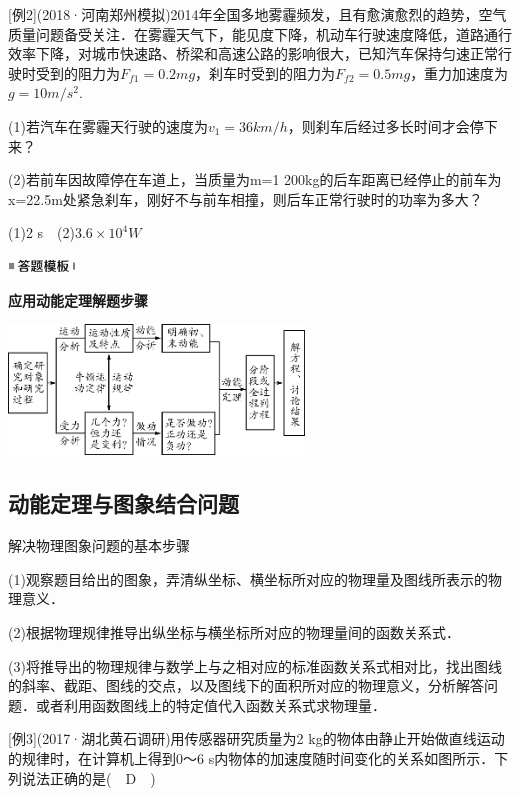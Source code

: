 \documentclass[cn,10.5pt,chinese,mac,chinesefont=founder]{elegantbook}
\begin{document}
{[}例2{]}(2018·河南郑州模拟)2014年全国多地雾霾频发，且有愈演愈烈的趋势，空气质量问题备受关注．在雾霾天气下，能见度下降，机动车行驶速度降低，道路通行效率下降，对城市快速路、桥梁和高速公路的影响很大，已知汽车保持匀速正常行驶时受到的阻力为$F_{f1}=0.2mg$，刹车时受到的阻力为$F_{f2}=0.5mg$，重力加速度为$g=10m/s^2$.

(1)若汽车在雾霾天行驶的速度为$v_1=36km/h$，则刹车后经过多长时间才会停下来？

(2)若前车因故障停在车道上，当质量为m=1 200kg的后车距离已经停止的前车为x=22.5m处紧急刹车，刚好不与前车相撞，则后车正常行驶时的功率为多大？
\begin{solution}
	(1)2 s　(2)$3.6\times 10^4 W$
\end{solution}


\begin{center}\includegraphics[width=0.70764in,height=0.12292in]{media/image25.png}

\textbf{应用动能定理解题步骤}
\end{center}


\begin{center}\includegraphics[width=3.09444in,height=1.36806in]{media/image224.png}\end{center}

\subsection{动能定理与图象结合问题}

解决物理图象问题的基本步骤

(1)观察题目给出的图象，弄清纵坐标、横坐标所对应的物理量及图线所表示的物理意义．

(2)根据物理规律推导出纵坐标与横坐标所对应的物理量间的函数关系式．

(3)将推导出的物理规律与数学上与之相对应的标准函数关系式相对比，找出图线的斜率、截距、图线的交点，以及图线下的面积所对应的物理意义，分析解答问题．或者利用函数图线上的特定值代入函数关系式求物理量．

{[}例3{]}(2017·湖北黄石调研)用传感器研究质量为2
kg的物体由静止开始做直线运动的规律时，在计算机上得到0～6
s内物体的加速度随时间变化的关系如图所示．下列说法正确的是(　D　)
\end{document}
